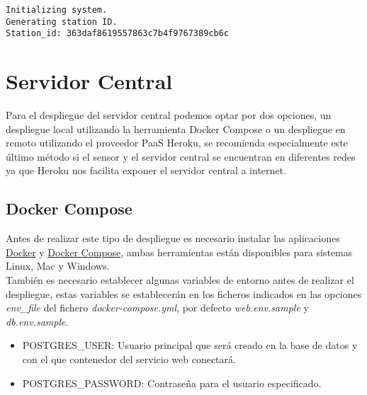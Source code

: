 \documentclass[../proyecto.tex]{subfiles}
\begin{document}
\begin{minipage}{\linewidth}
\begin{lstlisting}[caption=Ejemplo de arranque de la placa de desarrollo, captionpos=b, frame=single]
Initializing system.
Generating station ID.
Station_id: 363daf8619557863c7b4f9767389cb6c
\end{lstlisting}
\end{minipage}


\section{Servidor Central}

Para el despliegue del servidor central podemos optar por dos opciones, un despliegue local utilizando la herramienta Docker Compose o un despliegue en remoto utilizando el proveedor PaaS Heroku, se recomienda especialmente este último método si el sensor y el servidor central se encuentran en diferentes redes ya que Heroku nos facilita exponer el servidor central a internet.

\subsection{Docker Compose}
Antes de realizar este tipo de despliegue es necesario instalar las aplicaciones  \href{https://docs.docker.com/get-docker/}{Docker} y \href{https://docs.docker.com/compose/install/}{Docker Compose}, ambas herramientas están disponibles para sistemas Linux, Mac y Windows.\\

También es necesario establecer algunas variables de entorno antes de realizar el despliegue, estas variables se establecerán en los ficheros indicados en las opciones \textit{env\_file} del fichero \textit{docker-compose.yml}, por defecto  \textit{web.env.sample} y \textit{db.env.sample}.\\

\begin{itemize}
  \item POSTGRES\_USER: Usuario principal que será creado en la base de datos y con el que contenedor del servicio web conectará.
  \item POSTGRES\_PASSWORD: Contraseña para el usuario especificado.
\end{itemize}
\end{document}
